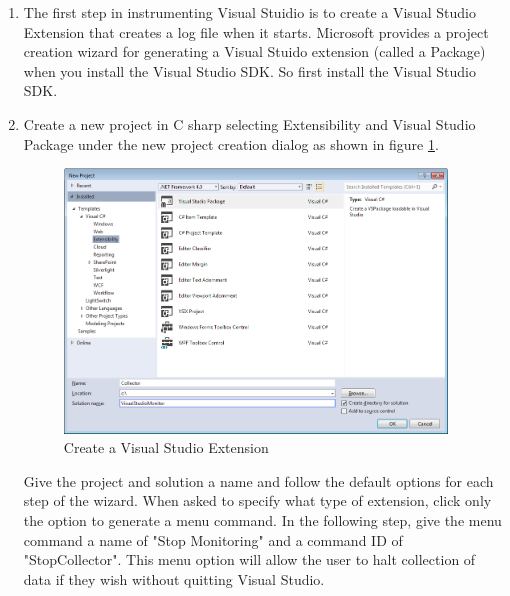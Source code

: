  \begin{Exercise}[type={program}, difficulty={1}]
\begin{enumerate}
\item
The first step in instrumenting Visual Stuidio is to create a Visual Studio Extension that creates a log file when it starts.   Microsoft provides a project creation wizard for generating a Visual Stuido extension (called a Package) when you install the Visual Studio SDK.  So first install the Visual Studio SDK.  

\item Create a new project in C sharp selecting Extensibility and Visual Studio Package under the new project creation dialog as shown in figure \ref{fig:ProjectCreation}.  
\begin{figure}[h]
	\centering
	\includegraphics[width=4in]{Graphics/CreateVSIXExtension.png}
	\caption{Create a Visual Studio Extension}
	\label{fig:ProjectCreation}
\end{figure}

Give the project and solution a name and follow the default options for each step of the wizard.  When asked to specify what type of extension, click only the option to generate a menu command.  In the following step, give the menu command a name of "Stop Monitoring" and a command ID of "StopCollector".  This menu option will allow the user to halt collection of data if they wish without quitting Visual Studio.  
\end{enumerate}
\end{Exercise}

